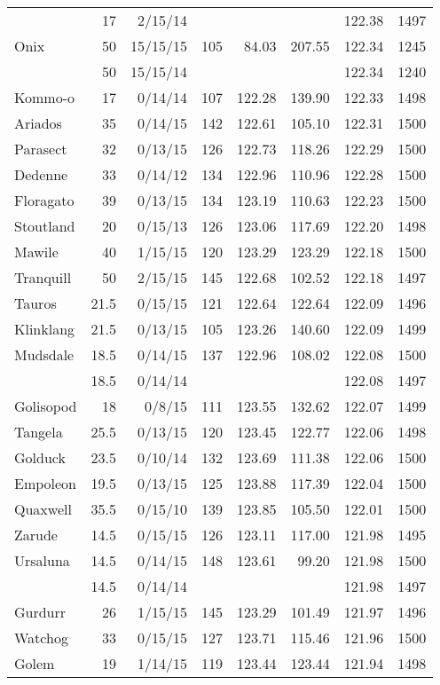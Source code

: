 \begin{longtable}{lrrrrrrr}
 & 17 & 2/15/14 & & & & 122.38 & 1497\\
Onix & 50 & 15/15/15 & 105 & 84.03 & 207.55 & 122.34 & 1245\\
 & 50 & 15/15/14 & & & & 122.34 & 1240\\
Kommo-o & 17 & 0/14/14 & 107 & 122.28 & 139.90 & 122.33 & 1498\\
Ariados & 35 & 0/14/15 & 142 & 122.61 & 105.10 & 122.31 & 1500\\
Parasect & 32 & 0/13/15 & 126 & 122.73 & 118.26 & 122.29 & 1500\\
Dedenne & 33 & 0/14/12 & 134 & 122.96 & 110.96 & 122.28 & 1500\\
Floragato & 39 & 0/13/15 & 134 & 123.19 & 110.63 & 122.23 & 1500\\
Stoutland & 20 & 0/15/13 & 126 & 123.06 & 117.69 & 122.20 & 1498\\
Mawile & 40 & 1/15/15 & 120 & 123.29 & 123.29 & 122.18 & 1500\\
Tranquill & 50 & 2/15/15 & 145 & 122.68 & 102.52 & 122.18 & 1497\\
Tauros & 21.5 & 0/15/15 & 121 & 122.64 & 122.64 & 122.09 & 1496\\
Klinklang & 21.5 & 0/13/15 & 105 & 123.26 & 140.60 & 122.09 & 1499\\
Mudsdale & 18.5 & 0/14/15 & 137 & 122.96 & 108.02 & 122.08 & 1500\\
 & 18.5 & 0/14/14 & & & & 122.08 & 1497\\
Golisopod & 18 & 0/8/15 & 111 & 123.55 & 132.62 & 122.07 & 1499\\
Tangela & 25.5 & 0/13/15 & 120 & 123.45 & 122.77 & 122.06 & 1498\\
Golduck & 23.5 & 0/10/14 & 132 & 123.69 & 111.38 & 122.06 & 1500\\
Empoleon & 19.5 & 0/13/15 & 125 & 123.88 & 117.39 & 122.04 & 1500\\
Quaxwell & 35.5 & 0/15/10 & 139 & 123.85 & 105.50 & 122.01 & 1500\\
Zarude & 14.5 & 0/15/15 & 126 & 123.11 & 117.00 & 121.98 & 1495\\
Ursaluna & 14.5 & 0/14/15 & 148 & 123.61 & 99.20 & 121.98 & 1500\\
 & 14.5 & 0/14/14 & & & & 121.98 & 1497\\
Gurdurr & 26 & 1/15/15 & 145 & 123.29 & 101.49 & 121.97 & 1496\\
Watchog & 33 & 0/15/15 & 127 & 123.71 & 115.46 & 121.96 & 1500\\
Golem & 19 & 1/14/15 & 119 & 123.44 & 123.44 & 121.94 & 1498\\

\end{longtable}
